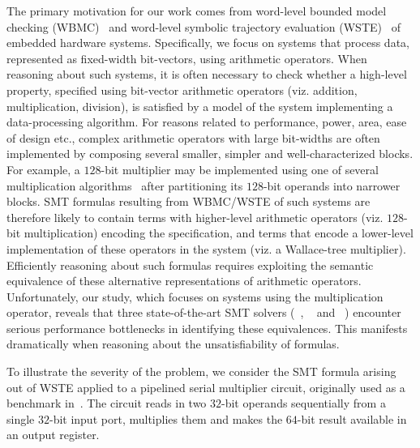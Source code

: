 The primary motivation for our work comes from word-level bounded
model checking (WBMC)~\cite{cbmc,hwcbmc} and word-level symbolic
trajectory evaluation (WSTE)~\cite{wste} of embedded hardware systems.
Specifically, we focus on systems that process data, represented as
fixed-width bit-vectors, using arithmetic operators.
When reasoning about such systems, it is often necessary to check
whether a high-level property, specified using bit-vector arithmetic
operators (viz. addition, multiplication, division), is satisfied by a
model of the system implementing a data-processing algorithm.  For
reasons related to performance, power, area, ease of design etc.,
complex arithmetic operators with large bit-widths are often
implemented by composing several smaller, simpler and
well-characterized blocks.  For example, a $128$-bit multiplier may be
implemented using one of several multiplication
algorithms~\cite{long,booth,wallace}
after partitioning its $128$-bit operands into narrower blocks.  SMT
formulas resulting from WBMC/WSTE of such systems are therefore likely
to contain terms with higher-level arithmetic operators
(viz. $128$-bit multiplication) encoding the specification, and terms
that encode a lower-level implementation of these operators in the
system (viz. a Wallace-tree multiplier).  Efficiently reasoning about
such formulas requires exploiting the semantic equivalence of these
alternative representations of arithmetic operators.  Unfortunately,
our study, which focuses on systems using the multiplication operator,
reveals that three state-of-the-art SMT solvers
({\zthree}~\cite{zthree}, {\cvcfour}~\cite{cvcfour} and
{\boolector}~\cite{boolector}) encounter serious performance
bottlenecks in identifying these equivalences.  This manifests
dramatically when reasoning about the unsatisfiability of formulas.

 To illustrate
the severity of the problem, we consider the SMT formula arising out
of WSTE applied to a pipelined serial multiplier circuit, originally
used as a benchmark in~\cite{wste}.  The circuit reads in two $32$-bit
operands sequentially from a single $32$-bit input port, multiplies
them and makes the $64$-bit result available in an output register.

